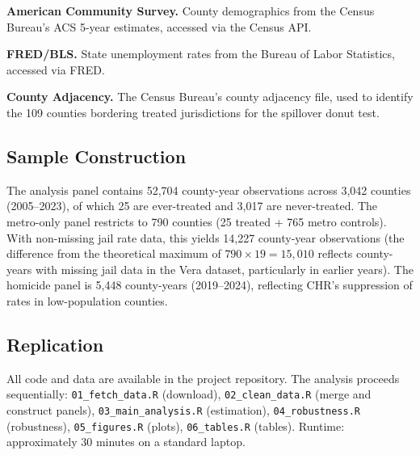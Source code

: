 \documentclass[12pt]{article}
\begin{document}
\textbf{American Community Survey.} County demographics from the Census Bureau's ACS 5-year estimates, accessed via the Census API.

\textbf{FRED/BLS.} State unemployment rates from the Bureau of Labor Statistics, accessed via FRED.

\textbf{County Adjacency.} The Census Bureau's county adjacency file, used to identify the 109 counties bordering treated jurisdictions for the spillover donut test.

\subsection{Sample Construction}

The analysis panel contains 52,704 county-year observations across 3,042 counties (2005--2023), of which 25 are ever-treated and 3,017 are never-treated. The metro-only panel restricts to 790 counties (25 treated + 765 metro controls). With non-missing jail rate data, this yields 14,227 county-year observations (the difference from the theoretical maximum of $790 \times 19 = 15{,}010$ reflects county-years with missing jail data in the Vera dataset, particularly in earlier years). The homicide panel is 5,448 county-years (2019--2024), reflecting CHR's suppression of rates in low-population counties.

\subsection{Replication}

All code and data are available in the project repository. The analysis proceeds sequentially: \texttt{01\_fetch\_data.R} (download), \texttt{02\_clean\_data.R} (merge and construct panels), \texttt{03\_main\_analysis.R} (estimation), \texttt{04\_robustness.R} (robustness), \texttt{05\_figures.R} (plots), \texttt{06\_tables.R} (tables). Runtime: approximately 30 minutes on a standard laptop.
\end{document}
